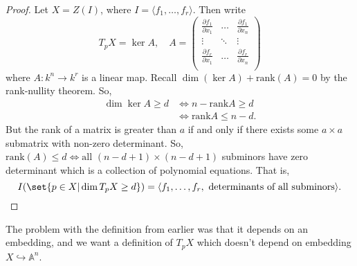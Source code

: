 \documentclass{article}
\newcommand{\A}{\mathbb{A}}
\DeclareMathOperator{\Der}{Der}
\begin{document}
\begin{proof}
    Let $X = Z(I)$, where $I = \langle f_1, \dotsc, f_r \rangle$. Then write
    \begin{equation*}
        T_p X = \ker A, \quad
        A =
        \begin{pmatrix}
            \frac{\partial f_1}{\partial x_1} & \dots & \frac{\partial f_1}{\partial x_n} \\
            \vdots & \ddots & \vdots \\
            \frac{\partial f_r}{\partial x_1} & \dots & \frac{\partial f_r}{\partial x_n} \\
        \end{pmatrix}
    \end{equation*}
    where $A: k^n \to k^r$ is a linear map.
    Recall $\dim(\ker A) + \text{rank}(A) = 0$ by the rank-nullity theorem.  So,
    \begin{align*}
        \dim \ker A \geq d &\iff n - \text{rank} A \geq d \\&\iff \text{rank} A \leq n - d.
    \end{align*}
    But the rank of a matrix is greater than $a$ if and only if there exists some $a \times a$ submatrix with non-zero determinant.
    So, $\text{rank}(A) \leq d \Leftrightarrow \text{all } (n - d + 1) \times (n - d + 1)$ subminors have zero determinant which is a collection of polynomial equations.
    That is,
    \begin{equation*}I (\set{p \in X | \dim T_p X \geq d}) = \langle f_1, \dotsc, f_r, \text{ determinants of all subminors} \rangle.\qedhere\end{equation*}
\end{proof}
The problem with the definition from earlier was that it depends on an embedding, and we want a definition of $T_p X$ which doesn't depend on embedding $X \hookrightarrow \A^n$.
\end{document}
